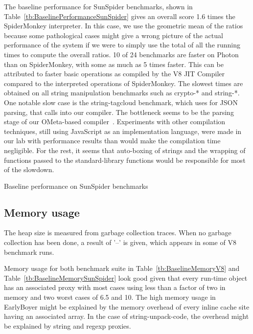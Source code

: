 The baseline performance for SunSpider benchmarks, shown in
Table~\ref{tb:BaselinePerformanceSunSpider} gives an overall
score 1.6 times the SpiderMonkey interpreter. In this case, we use the
geometric mean of the ratios because some pathological cases might give a wrong
picture of the actual performance of the system if we were to simply use the
total of all the running times to compute the overall ratios.  10 of 24
benchmarks are faster on Photon than on SpiderMonkey, with some as much as 5
times faster. This can be attributed to faster basic operations as compiled by
the V8 JIT Compiler compared to the interpreted operations of SpiderMonkey. The
slowest times are obtained on all string manipulation benchmarks such as
crypto-* and string-*. One notable slow case is the string-tagcloud benchmark,
which uses  for JSON parsing, that calls into our compiler.  The
bottleneck seems to be the parsing stage of our OMeta-based compiler~\cite{Warth:2007}.
Experiments with other compilation techniques, still using JavaScript as an
implementation language, were made in our lab with performance results than
would make the compilation time negligible. For the rest, it seems that
auto-boxing of strings and the wrapping of functions passed to the
standard-library functions would be responsible for most of the slowdown.


\begin{table}[htb]
\caption{Baseline performance on SunSpider benchmarks}
\centering
    
\label{tb:BaselinePerformanceSunSpider}
\end{table}

\subsection{Memory usage}
The heap size is measured from garbage collection traces. When no garbage
collection has been done, a result of '--' is given, which appears in some of V8
benchmark runs.

Memory usage for both benchmark suite in Table~\ref{tb:BaselineMemoryV8} and
Table~\ref{tb:BaselineMemorySunSpider} look good given that every run-time
object has an associated proxy with most cases using less than a factor of two
in memory and two worst cases of 6.5 and 10. The high memory usage in
EarlyBoyer might be explained by the memory overhead of every inline cache
site having an associated array. In the case of string-unpack-code, the
overhead might be explained by string and regexp proxies.

